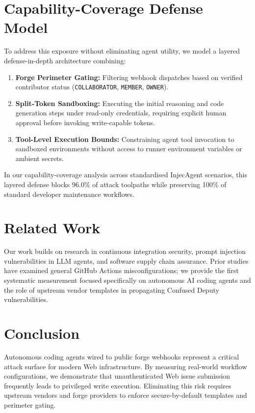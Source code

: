\documentclass[sigconf,anonymous,review]{acmart}
\begin{document}
\section{Capability-Coverage Defense Model}
\label{sec:defense}
To address this exposure without eliminating agent utility, we model a layered defense-in-depth architecture combining:
\begin{enumerate}
    \item \textbf{Forge Perimeter Gating:} Filtering webhook dispatches based on verified contributor status (\texttt{COLLABORATOR}, \texttt{MEMBER}, \texttt{OWNER}).
    \item \textbf{Split-Token Sandboxing:} Executing the initial reasoning and code generation steps under read-only credentials, requiring explicit human approval before invoking write-capable tokens.
    \item \textbf{Tool-Level Execution Bounds:} Constraining agent tool invocation to sandboxed environments without access to runner environment variables or ambient secrets.
\end{enumerate}
In our capability-coverage analysis across standardised InjecAgent scenarios, this layered defense blocks 96.0\% of attack toolpaths while preserving 100\% of standard developer maintenance workflows.

\section{Related Work}
\label{sec:related_work}
Our work builds on research in continuous integration security, prompt injection vulnerabilities in LLM agents, and software supply chain assurance. Prior studies have examined general GitHub Actions misconfigurations; we provide the first systematic measurement focused specifically on autonomous AI coding agents and the role of upstream vendor templates in propagating Confused Deputy vulnerabilities.

\section{Conclusion}
\label{sec:conclusion}
Autonomous coding agents wired to public forge webhooks represent a critical attack surface for modern Web infrastructure. By measuring real-world workflow configurations, we demonstrate that unauthenticated Web issue submission frequently leads to privileged write execution. Eliminating this risk requires upstream vendors and forge providers to enforce secure-by-default templates and perimeter gating.



\end{document}
